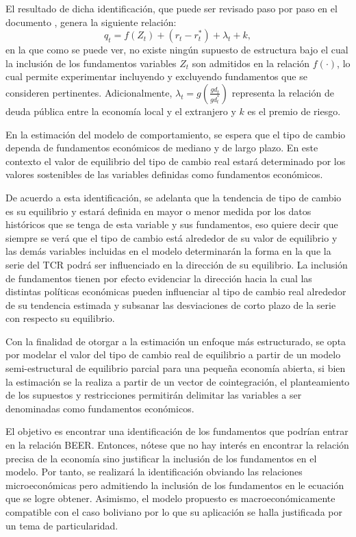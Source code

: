 \documentclass[12pt,letterpaper]{article}
\begin{document}
El resultado de dicha identificación, que puede ser revisado paso por paso en el documento \cite{clark1999exchange}, genera la siguiente relación:
\begin{equation}\label{qb}
q_t=f(Z_t)+(r_t-r_t^*)+\lambda_t+k,
\end{equation}
en la que como se puede ver, no existe ningún supuesto de estructura bajo el cual la inclusión de los fundamentos variables $Z_t$ son admitidos en la relación $f(\cdot)$, lo cual permite experimentar incluyendo y excluyendo fundamentos que se consideren pertinentes. Adicionalmente, $\lambda_t=g(\frac{gd_t}{gd_t^*})$ representa la relación de deuda pública entre la economía local y el extranjero y $k$ es el premio de riesgo. 

En la estimación del modelo de comportamiento, se espera que el tipo de cambio dependa de fundamentos económicos de mediano y de largo plazo. En este contexto el valor de equilibrio del tipo de cambio real estará determinado por los valores sostenibles de las variables definidas como fundamentos económicos. 

De acuerdo a esta identificación, se adelanta que la tendencia de tipo de cambio es su equilibrio y estará definida en mayor o menor medida por los datos históricos que se tenga de esta variable y sus fundamentos, eso quiere decir que siempre se verá que el tipo de cambio está alrededor de su valor de equilibrio y las demás variables incluidas en el modelo determinarán la forma en la que la serie del TCR podrá ser influenciado en la dirección de su equilibrio. La inclusión de fundamentos tienen por efecto evidenciar la dirección hacia la cual las distintas políticas económicas pueden influenciar al tipo de cambio real alrededor de su tendencia estimada y subsanar las desviaciones de corto plazo de la serie con respecto su equilibrio.

Con la finalidad de otorgar a la estimación un enfoque más estructurado, se opta por modelar el valor del tipo de cambio real de equilibrio a partir de un modelo semi-estructural de equilibrio parcial para una pequeña economía abierta, si bien la estimación se la realiza a partir de un vector de cointegración, el planteamiento de los supuestos y restricciones permitirán delimitar las variables a ser denominadas como fundamentos económicos.

El objetivo es encontrar una identificación de los fundamentos que podrían entrar en la relación BEER. Entonces, nótese que no hay interés en encontrar la relación precisa de la economía sino justificar la inclusión de los fundamentos en el modelo. Por tanto, se realizará la identificación obviando las relaciones microeconómicas pero admitiendo la inclusión de los fundamentos en le ecuación que se logre obtener. Asimismo, el modelo propuesto es macroeconómicamente compatible con el caso boliviano por lo que su aplicación se halla justificada por un tema de particularidad.
\end{document}
